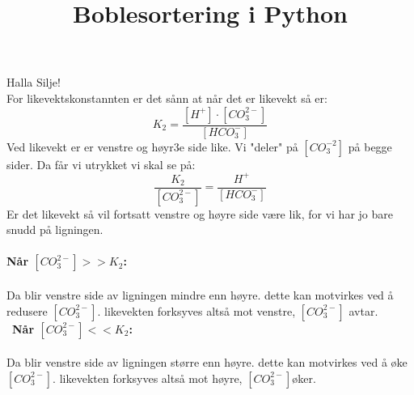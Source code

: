 \documentclass{article}
\title{Boblesortering i Python}
\author{}
\date{}
\begin{document}
Halla Silje!\\
For likevektskonstannten er det  sånn at når det er likevekt så er:\\
$$K_2=\frac{[H^+]\cdot [CO_3^{2-}]}{[HCO_3^-]}$$
Ved likevekt er er venstre og høyr3e side like. Vi "deler" på $[CO_3^{-2}]$ på begge sider. Da får vi utrykket vi skal se på:\\
$$\frac{K_2}{[CO_3^{2-}]}=\frac{H^+}{[HCO_3^-]}$$
Er det likevekt så vil fortsatt venstre og høyre side være lik, for vi har jo bare snudd på ligningen.\\\\
\textbf{Når $[CO_3^{2-}]>>K_2$:}\\\\
Da blir venstre side av ligningen mindre enn høyre.  dette kan motvirkes ved å redusere $[CO_3^{2-}]$.  likevekten forksyves altså mot venstre, $[CO_3^{2-}]$ avtar.\\\
\textbf{Når $[CO_3^{2-}]<<K_2$:}\\\\
Da blir venstre side av ligningen større enn høyre.  dette kan motvirkes ved å øke $[CO_3^{2-}]$.  likevekten forksyves altså mot høyre, $[CO_3^{2-}]$øker.
\end{document}
